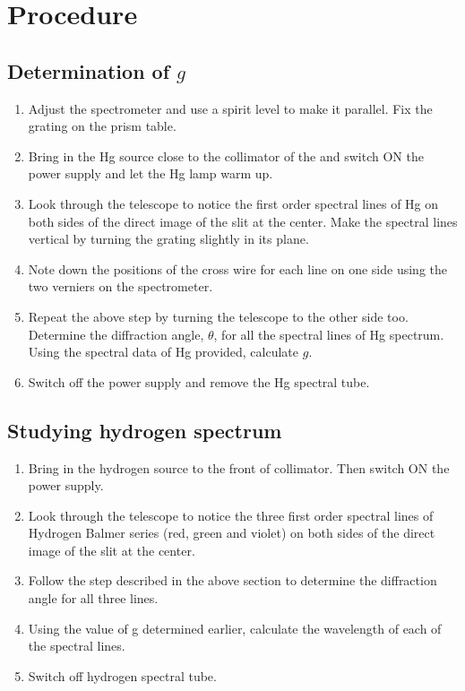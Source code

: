 \section{Procedure}

\subsection*{Determination of $g$}

\begin{enumerate}
    \item Adjust the spectrometer and use a spirit level to make it parallel. Fix the grating on the prism table.
    \item Bring in the Hg source close to the collimator of the and switch ON the power supply and let the Hg lamp warm up.
    \item Look through the telescope to notice the first order spectral lines of Hg on both sides of the direct image of the slit at the center.
    Make the spectral lines vertical by turning the grating slightly in its plane.
    \item Note down the positions of the cross wire for each line on one side using the two
    verniers on the spectrometer.
    \item Repeat the above step by turning the telescope to the other side too. Determine the
    diffraction angle, $\theta$, for all the spectral lines of Hg spectrum. Using the
    spectral data of Hg provided, calculate $g$.
    \item Switch off the power supply and remove the Hg spectral tube.
\end{enumerate}

\subsection*{Studying hydrogen spectrum}

\begin{enumerate}
    \item Bring in the hydrogen source to the front of collimator. Then switch ON the
    power supply.
    \item Look through the telescope to notice the three first order spectral lines of Hydrogen Balmer series (red, green and violet) on both sides of the direct image of the slit at the center.
    \item Follow the step described in the above section to determine the diffraction angle for all three lines.
    \item Using the value of g determined earlier, calculate the wavelength of each of the
    spectral lines.
    \item Switch off hydrogen spectral tube.
\end{enumerate}